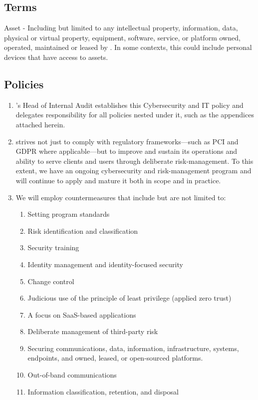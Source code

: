 \documentclass[../main.tex]{subfiles}
\begin{document}
  \subsection{Terms}
      Asset - Including but limited to any intellectual property, information, data, physical or virtual property, equipment, software, service, or platform owned, operated, maintained or
      leased by \CompanyName. In some contexts, this could include personal devices that have access to \CompanyName  assets.
  \subsection{Policies}
  \begin{enumerate}
    \item \CompanyName's Head of Internal Audit establishes this Cybersecurity and IT policy and delegates responsibility for all policies nested under it, such as the appendices attached herein.
    \item \CompanyName strives not just to comply with regulatory frameworks—such as PCI and GDPR where applicable—but to improve and sustain its operations and ability to serve clients and users
    through deliberate risk-management. To this extent, we have an ongoing cybersecurity and risk-management program and will continue to apply and mature it both in scope and in practice.
    \item We will employ countermeasures that include but are not limited to:
    \begin{enumerate}
      \item Setting program standards
      \item Risk identification and classification
      \item Security training
      \item Identity management and identity-focused security
      \item Change control
      \item Judicious use of the principle of least privilege (applied zero trust)
      \item A focus on SaaS-based applications
      \item Deliberate management of third-party risk
      \item Securing communications, data, information, infrastructure, systems, endpoints, and owned, leased, or open-sourced platforms.
      \item Out-of-band communications
      \item Information classification, retention, and disposal

\end{enumerate}
\end{enumerate}
\end{document}
